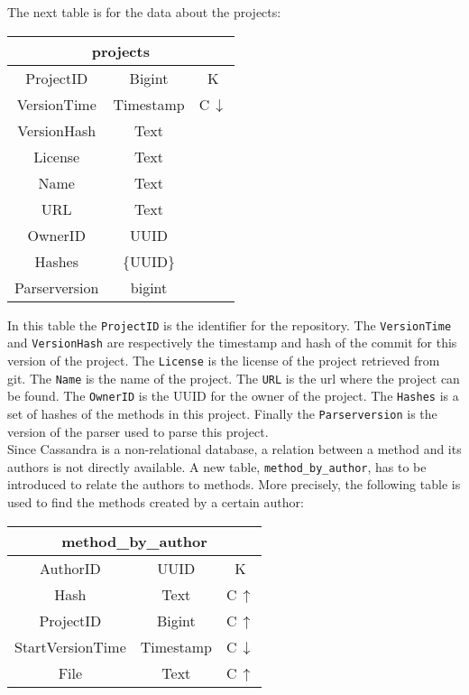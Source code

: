 \documentclass[../Main.tex]{subfiles}
\begin{document}
The next table is for the data about the projects:

\begin{table}[h]
    \centering
\begin{tabular}{|ccc|}
    \hline
    \multicolumn{3}{|c|}{\textbf{projects}} \\ \hline
    ProjectID & Bigint & K \\
    VersionTime & Timestamp & C\,$\downarrow$ \\
    VersionHash & Text & \\
    License & Text & \\
    Name & Text & \\ 
    URL & Text & \\
    OwnerID & UUID & \\
    Hashes & \{UUID\} & \\
    Parserversion & bigint & \\
    \hline
\end{tabular}
\end{table}

In this table the \texttt{ProjectID} is the identifier for the repository. The \texttt{VersionTime} and \texttt{VersionHash} are respectively the timestamp and hash of the commit for this version of the project. The \texttt{License} is the license of the project retrieved from git. The \texttt{Name} is the name of the project. The \texttt{URL} is the url where the project can be found. The \texttt{OwnerID} is the UUID for the owner of the project. The \texttt{Hashes} is a set of hashes of the methods in this project. Finally the \texttt{Parserversion} is the version of the parser used to parse this project.\\

Since Cassandra is a non-relational database, a relation between a method and its authors is not directly available. A new table, \texttt{method\_by\_author}, has to be introduced to relate the authors to methods. More precisely, the following table is used to find the methods created by a certain author:

\begin{table}[h]
    \centering
\begin{tabular}{|ccc|}
\hline
    \multicolumn{3}{|c|}{\textbf{method\_by\_author}}   \\
    \hline
    AuthorID & UUID & K \\
    Hash & Text & C\,$\uparrow$\\
    ProjectID & Bigint & C\,$\uparrow$\\
    StartVersionTime & Timestamp & C\,$\downarrow$\\
    File & Text & C\,$\uparrow$\\
    \hline
\end{tabular}
\end{table}
\end{document}
